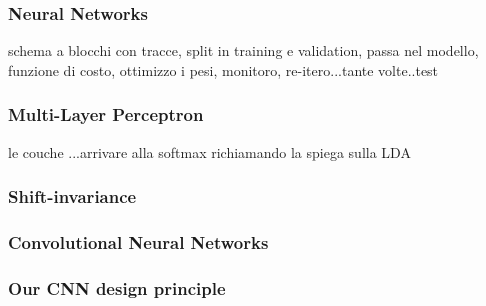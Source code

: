 \begin{frame}
\frametitle{Neural Networks}
schema a blocchi con tracce, split in training e validation, passa nel modello, funzione di costo, ottimizzo i pesi, monitoro, re-itero...tante volte..test
\end{frame}

\begin{frame}
\frametitle{Multi-Layer Perceptron}
le couche ...arrivare alla softmax richiamando la spiega sulla LDA

\end{frame}

\begin{frame}

\frametitle{Shift-invariance}
\end{frame}

\begin{frame}
\frametitle{Convolutional Neural Networks}
\end{frame}


\begin{frame}
\frametitle{Our CNN design principle}

\end{frame}


